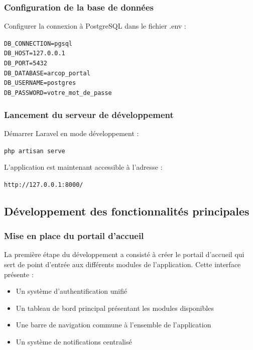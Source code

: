 \subsubsection*{Configuration de la base de données}
Configurer la connexion à PostgreSQL dans le fichier .env :

\begin{tcolorbox}[colback=black, coltext=white, title=Configuration de la base de données, fonttitle=\bfseries]
\texttt{DB\_CONNECTION=pgsql} \\
\texttt{DB\_HOST=127.0.0.1} \\
\texttt{DB\_PORT=5432} \\
\texttt{DB\_DATABASE=arcop\_portal} \\
\texttt{DB\_USERNAME=postgres} \\
\texttt{DB\_PASSWORD=votre\_mot\_de\_passe}
\end{tcolorbox}

\subsubsection*{Lancement du serveur de développement}
Démarrer Laravel en mode développement :

\begin{tcolorbox}[colback=black, coltext=white, title=Lancement du serveur Laravel, fonttitle=\bfseries]
\texttt{php artisan serve}
\end{tcolorbox}

L'application est maintenant accessible à l'adresse :

\begin{tcolorbox}[colback=black, coltext=white, title=URL d'accès, fonttitle=\bfseries]
\texttt{http://127.0.0.1:8000/}
\end{tcolorbox}

\subsection{Développement des fonctionnalités principales}

\subsubsection{Mise en place du portail d'accueil}
La première étape du développement a consisté à créer le portail d'accueil qui sert de point d'entrée aux différents modules de l'application. Cette interface présente :

\begin{itemize}
    \item Un système d'authentification unifié
    \item Un tableau de bord principal présentant les modules disponibles
    \item Une barre de navigation commune à l'ensemble de l'application
    \item Un système de notifications centralisé
\end{itemize}

